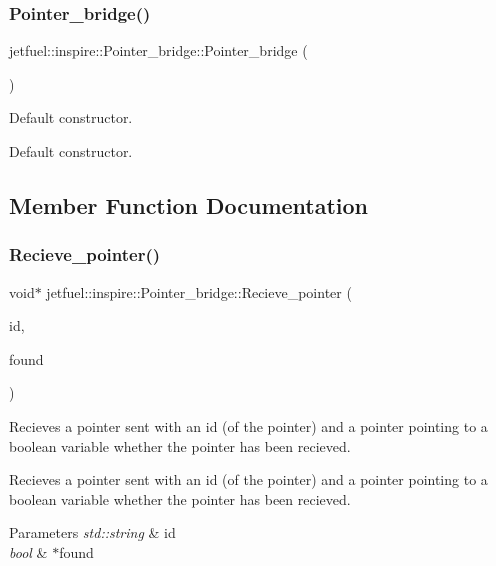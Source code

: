 \subsubsection{\texorpdfstring{Pointer\+\_\+bridge()}{Pointer\_bridge()}}
{\footnotesize\ttfamily jetfuel\+::inspire\+::\+Pointer\+\_\+bridge\+::\+Pointer\+\_\+bridge (\begin{DoxyParamCaption}{ }\end{DoxyParamCaption})\hspace{0.3cm}{\ttfamily [inline]}}



Default constructor. 

Default constructor. 

\subsection{Member Function Documentation}
\mbox{\label{classjetfuel_1_1inspire_1_1Pointer__bridge_a031c7d904e4e86096e2c399f8db8a1f8}} 
\subsubsection{\texorpdfstring{Recieve\+\_\+pointer()}{Recieve\_pointer()}}
{\footnotesize\ttfamily void$\ast$ jetfuel\+::inspire\+::\+Pointer\+\_\+bridge\+::\+Recieve\+\_\+pointer (\begin{DoxyParamCaption}\item[{std\+::string}]{id,  }\item[{bool $\ast$}]{found }\end{DoxyParamCaption})\hspace{0.3cm}{\ttfamily [inline]}}



Recieves a pointer sent with an id (of the pointer) and a pointer pointing to a boolean variable whether the pointer has been recieved. 

Recieves a pointer sent with an id (of the pointer) and a pointer pointing to a boolean variable whether the pointer has been recieved.


\begin{DoxyParams}{Parameters}
{\em std\+::string} & id \\
\hline
{\em bool} & $\ast$found \\
\hline
\end{DoxyParams}
\mbox{\label{classjetfuel_1_1inspire_1_1Pointer__bridge_a805c0fa469cca7d6acdfd285b92aa9c8}} 
